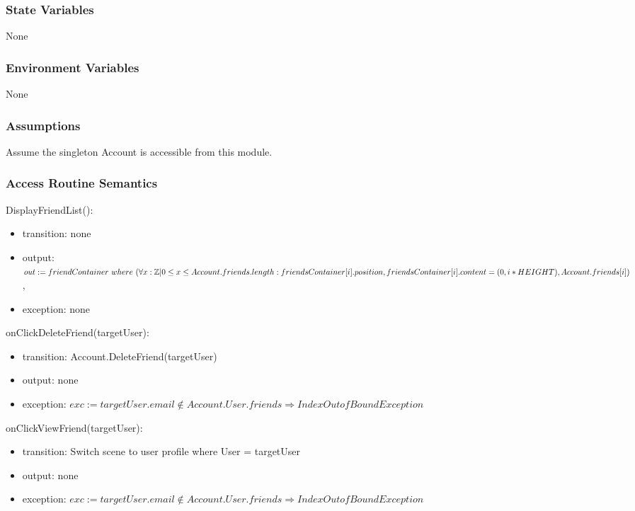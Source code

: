 \documentclass[12pt, titlepage]{article}
\begin{document}
\subsubsection{State Variables}

None

\subsubsection{Environment Variables}

None

\subsubsection{Assumptions}

Assume the singleton Account is accessible from this module.

\subsubsection{Access Routine Semantics}

\noindent DisplayFriendList():
\begin{itemize}
\item transition: none
\item output: $out := friendContainer\ where\ (\forall x : \mathbb{Z} | 0 \leq x \leq Account.friends.length:\\ friendsContainer[i].position, friendsContainer[i].content =\\ (0, i*HEIGHT), Account.friends[i])$,
\item exception: none
\end{itemize}

\noindent onClickDeleteFriend(targetUser):
\begin{itemize}
\item transition: Account.DeleteFriend(targetUser)
\item output: none
\item exception: $exc := targetUser.email \notin Account.User.friends \Rightarrow IndexOutofBound Exception$
\end{itemize}

\noindent onClickViewFriend(targetUser):
\begin{itemize}
\item transition: Switch scene to user profile where User = targetUser
\item output: none
\item exception: $exc := targetUser.email \notin Account.User.friends \Rightarrow IndexOutofBound Exception$
\end{itemize}
\end{document}
